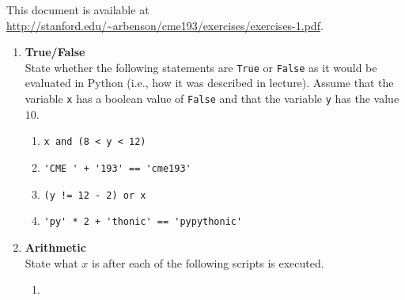 \documentclass{article}
\begin{document}
\pagestyle{fancy}

This document is available at \url{http://stanford.edu/~arbenson/cme193/exercises/exercises-1.pdf}.


\begin{enumerate}
\item \textbf{True/False} \\
State whether the following statements are \texttt{True} or \texttt{False} as it would be evaluated in Python (i.e., how it was described in lecture).  Assume that the variable \texttt{x} has a boolean value of \texttt{False} and that the variable \texttt{y} has the value $10$.

\begin{enumerate}
\item
\begin{lstlisting}
x and (8 < y < 12)
\end{lstlisting}
\end{enumerate}

\begin{enumerate}
\setcounter{enumii}{1}
\item 
\begin{lstlisting}
'CME ' + '193' == 'cme193'
\end{lstlisting}
\end{enumerate}

\begin{enumerate}
\setcounter{enumii}{2}
\item 
\begin{lstlisting}
(y != 12 - 2) or x
\end{lstlisting}
\end{enumerate}

\begin{enumerate}
\setcounter{enumii}{3}
\item 
\begin{lstlisting}
'py' * 2 + 'thonic' == 'pypythonic'
\end{lstlisting}
\end{enumerate}

\item \textbf{Arithmetic} \\
State what $x$ is after each of the following scripts is executed.

\begin{enumerate}
\item 
\end{enumerate}


\end{enumerate}
\end{document}
